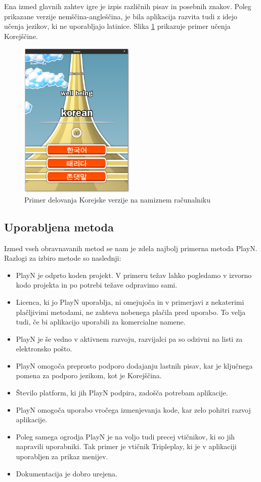 Ena izmed glavnih zahtev igre je izpis različnih pisav in posebnih znakov. Poleg prikazane verzije nemščina-angleščina, je bila aplikacija razvita tudi z idejo učenja jezikov, ki ne uporabljajo latinice. Slika \ref{korean} prikazuje primer učenja Korejščine. 

\begin{figure}
\begin{center}
\includegraphics[width=5.5cm]{pic/defg-korean.png}
\end{center}
\caption{Primer delovanja Korejske verzije na namiznem računalniku}
\label{korean}
\end{figure} 

\subsection{Uporabljena metoda}

Izmed vseh obravnavanih metod se nam je zdela najbolj primerna metoda PlayN. Razlogi za izbiro metode so naslednji:

\begin{itemize}
\item PlayN je odprto koden projekt. V primeru težav lahko pogledamo v izvorno kodo projekta in po potrebi težave odpravimo sami.
\item Licenca, ki jo PlayN uporablja, ni omejujoča in v primerjavi z nekaterimi plačljivimi metodami, ne zahteva nobenega plačila pred uporabo. To velja tudi, če bi aplikacijo uporabili za komercialne namene.
\item PlayN je še vedno v aktivnem razvoju, razvijalci pa so odzivni na listi za elektronsko pošto.
\item PlayN omogoča preprosto podporo dodajanju lastnih pisav, kar je ključnega pomena za podporo jezikom, kot je Korejščina.
\item Število platform, ki jih PlayN podpira, zadošča potrebam aplikacije.
\item PlayN omogoča uporabo vročega izmenjevanja kode, kar zelo pohitri razvoj aplikacije.
\item Poleg samega ogrodja PlayN je na voljo tudi precej vtičnikov, ki so jih napravili uporabniki. Tak primer je vtičnik Tripleplay, ki je v aplikaciji uporabljen za prikaz menijev.
\item Dokumentacija je dobro urejena.
\end{itemize}

